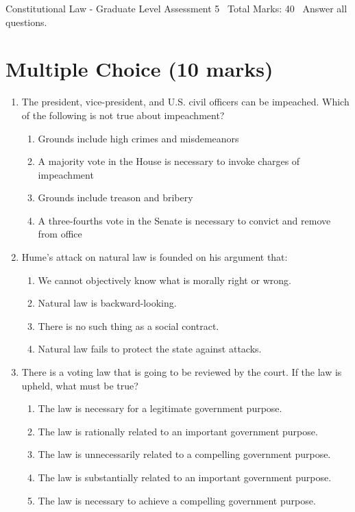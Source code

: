 \documentclass[12pt]{article}
\begin{document}
\begin{center}
Constitutional Law - Graduate Level Assessment 5 \
Total Marks: 40 \
Answer all questions.
\end{center}

\section*{Multiple Choice (10 marks)}
\begin{enumerate}[label=\arabic*.]
\item The president, vice-president, and U.S. civil officers can be impeached. Which of the following is not true about impeachment?
\begin{enumerate}[label=(\alph*)]
    \item Grounds include high crimes and misdemeanors
    \item A majority vote in the House is necessary to invoke charges of impeachment
    \item Grounds include treason and bribery
    \item A three-fourths vote in the Senate is necessary to convict and remove from office
\end{enumerate}
\item Hume's attack on natural law is founded on his argument that:
\begin{enumerate}[label=(\alph*)]
    \item We cannot objectively know what is morally right or wrong.
    \item Natural law is backward-looking.
    \item There is no such thing as a social contract.
    \item Natural law fails to protect the state against attacks.
\end{enumerate}
\item There is a voting law that is going to be reviewed by the court. If the law is upheld, what must be true?
\begin{enumerate}[label=(\alph*)]
    \item The law is necessary for a legitimate government purpose.
    \item The law is rationally related to an important government purpose.
    \item The law is unnecessarily related to a compelling government purpose.
    \item The law is substantially related to an important government purpose.
    \item The law is necessary to achieve a compelling government purpose.

\end{enumerate}
\end{enumerate}
\end{document}
